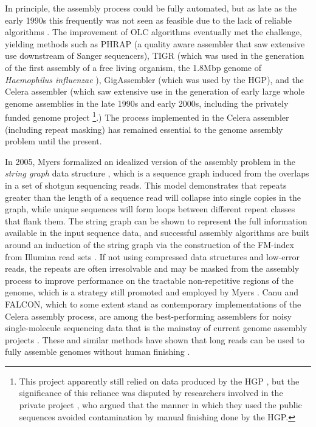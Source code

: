 In principle, the assembly process could be fully automated, but as late as the early 1990s this frequently was not seen as feasible due to the lack of reliable algorithms \cite{mahy1991sequencing}.
The improvement of OLC algorithms eventually met the challenge, yielding methods such as PHRAP \cite{green1999phrap} (a quality aware assembler that saw extensive use downstream of Sanger sequencers), TIGR \cite{sutton1995tigr} (which was used in the generation of the first assembly of a free living organism, the 1.8Mbp genome of \emph{Haemophilus influenzae} \cite{fleischmann1995whole}), GigAssembler \cite{kent2001assembly} (which was used by the HGP), and the Celera assembler \cite{myers2000whole,miller2008aggressive} (which saw extensive use in the generation of early large whole genome assemblies in the late 1990s and early 2000s, including the privately funded genome project \cite{venter2001sequence}\footnote{This project apparently still relied on data produced by the HGP \cite{waterston2002sequencing}, but the significance of this reliance was disputed by researchers involved in the private project \cite{myers2002sequencing}, who argued that the manner in which they used the public sequences avoided contamination by manual finishing done by the HGP.}.)
The process implemented in the Celera assembler (including repeat masking) has remained essential to the genome assembly problem until the present.

In 2005, Myers formalized an idealized version of the assembly problem in the \emph{string graph} data structure \cite{myers2005fragment}, which is a sequence graph induced from the overlaps in a set of shotgun sequencing reads.
This model demonstrates that repeats greater than the length of a sequence read will collapse into single copies in the graph, while unique sequences will form loops between different repeat classes that flank them.
The string graph can be shown to represent the full information available in the input sequence data, and successful assembly algorithms are built around an induction of the string graph via the construction of the FM-index \cite{ferragina2001experimental} from Illumina read sets \cite{simpson2010,simpson2012efficient,li2015fermikit}.
If not using compressed data structures and low-error reads, the repeats are often irresolvable and may be masked from the assembly process to improve performance on the tractable non-repetitive regions of the genome, which is a strategy still promoted and employed by Myers \cite{myers2014efficient}.
Canu and FALCON, which to some extent stand as contemporary implementations of the Celera assembly process, are among the best-performing assemblers for noisy single-molecule sequencing data that is the mainstay of current genome assembly projects \cite{chin2016phased,koren2017canu}.
These and similar methods have shown that long reads can be used to fully assemble genomes without human finishing \cite{loman2015complete,jain2018nanopore}.

